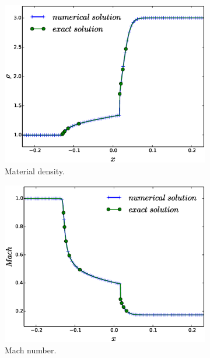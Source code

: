 \documentclass[times,doublespace]{fldauth}%
\begin{document}
\begin{figure}[h]
%
    \begin{subfigure}{0.49\textwidth}
    \includegraphics[width=\linewidth]{figures/dpt-xs/mass-diff-density-nel-2700-plot.eps}
    \caption{Material density.}\label{fig:mach-3-dpt-xs-dens}
    \end{subfigure}
%
    \begin{subfigure}{0.49\textwidth}
    \includegraphics[width=\linewidth]{figures/dpt-xs/mass-diff-mach-number-nel-2700-plot.eps}
    \caption{Mach number.}\label{fig:mach-3-dpt-xs-mach}
    \end{subfigure}
%
    \begin{subfigure}{0.49\textwidth}

\end{subfigure}
\end{figure}
\end{document}
